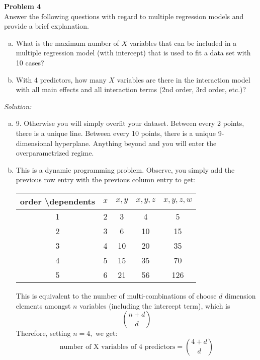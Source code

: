 \documentclass{article}
\newenvironment{problem}[2][Problem]
    { \begin{mdframed}[backgroundcolor=gray!20] \textbf{#1 #2} \\}
    {  \end{mdframed}}
\newenvironment{solution}
    {\textit{Solution:}}
    {}
\begin{document}
\begin{problem}{4}
Answer the following questions with regard to multiple regression models and provide a brief explanation.
\begin{enumerate}[(a)]
\item What is the maximum number of $X$ variables that can be included in a multiple regression model (with intercept) that is used to fit a data set with 10 cases?
\item With 4 predictors, how many $X$ variables are there in the interaction model with all main effects and all interaction terms (2nd order, 3rd order, etc.)?
\end{enumerate}
\end{problem}
\begin{solution}
\begin{enumerate}[(a)]
\item 9. Otherwise you will simply overfit your dataset. Between every 2 points, there is a unique line. Between every 10 points, there is a unique 9-dimensional hyperplane. Anything beyond and you will enter the overparametrized regime. 
\item This is a dynamic programming problem. Observe, you simply add the previous row entry with the previous column entry to get: 

\begin{table}[H]
\centering
\begin{tabular}{|c|c|c|c|c|}
\hline
order \textbackslash dependents & $x$ & $x,y$ & $x,y,z$ & $x,y,z,w$ \\ \hline
1                               & 2 & 3   & 4     & 5       \\ \hline
2                               & 3 & 6   & 10    & 15      \\ \hline
3                               & 4 & 10  & 20    & 35      \\ \hline
4                               & 5 & 15  & 35    & 70      \\ \hline
5                               & 6 & 21  & 56    & 126     \\ \hline
\end{tabular}
\end{table}
This is equivalent to the number of multi-combinations of choose $d$ dimension elements amongst $n$ variables (including the intercept term), which is 
$${n + d \choose d}$$
Therefore, setting $n = 4,$ we get: 
$$\text{number of X variables of 4 predictors} = {4 + d \choose d}$$
\end{enumerate}
\end{solution}
\end{document}

